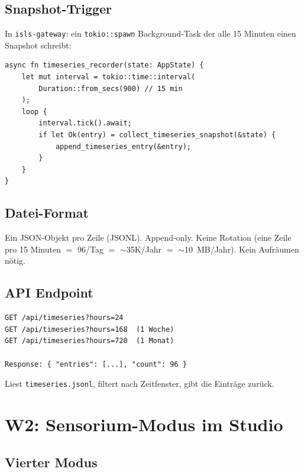 \documentclass[11pt,a4paper]{article}
\begin{document}
\subsection{Snapshot-Trigger}

In \texttt{isls-gateway}: ein \texttt{tokio::spawn} Background-Task 
der alle 15 Minuten einen Snapshot schreibt:

\begin{lstlisting}[style=rust]
async fn timeseries_recorder(state: AppState) {
    let mut interval = tokio::time::interval(
        Duration::from_secs(900) // 15 min
    );
    loop {
        interval.tick().await;
        if let Ok(entry) = collect_timeseries_snapshot(&state) {
            append_timeseries_entry(&entry);
        }
    }
}
\end{lstlisting}

\subsection{Datei-Format}

Ein JSON-Objekt pro Zeile (JSONL). Append-only. Keine Rotation 
(eine Zeile pro 15 Minuten $=$ 96/Tag $=$ $\sim$35K/Jahr $=$ 
$\sim$10~MB/Jahr). Kein Aufr\"aumen n\"otig.

\subsection{API Endpoint}

\begin{lstlisting}[style=bash]
GET /api/timeseries?hours=24
GET /api/timeseries?hours=168  (1 Woche)
GET /api/timeseries?hours=720  (1 Monat)

Response: { "entries": [...], "count": 96 }
\end{lstlisting}

Liest \texttt{timeseries.jsonl}, filtert nach Zeitfenster, 
gibt die Eintr\"age zur\"uck.


\section{W2: Sensorium-Modus im Studio}
\label{sec:w2}

\subsection{Vierter Modus}
\end{document}
